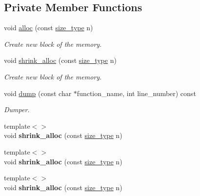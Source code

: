 \subsection*{Private Member Functions}
\begin{DoxyCompactItemize}
\item 
void \hyperlink{classatom_1_1vector__t_aa4355cec63c373a8af58c0c432a590c0}{alloc} (const \hyperlink{classatom_1_1vector__t_a1790d79321f4fa8d2580474dd0f56033}{size\+\_\+type} n)
\begin{DoxyCompactList}\small\item\em Create new block of the memory. \end{DoxyCompactList}\item 
void \hyperlink{classatom_1_1vector__t_afdf1ffed030302fa380605478984b854}{shrink\+\_\+alloc} (const \hyperlink{classatom_1_1vector__t_a1790d79321f4fa8d2580474dd0f56033}{size\+\_\+type} n)
\begin{DoxyCompactList}\small\item\em Create new block of the memory. \end{DoxyCompactList}\item 
void \hyperlink{classatom_1_1vector__t_a5dbc4a2fbead76e7bfb2105693bb9680}{dump} (const char $\ast$function\+\_\+name, int line\+\_\+number) const
\begin{DoxyCompactList}\small\item\em Dumper. \end{DoxyCompactList}\item 
\mbox{\label{classatom_1_1vector__t_a66aec7f86f32ef3d16e1d90cc7260abf}} 
{\footnotesize template$<$$>$ }\\void {\bfseries shrink\+\_\+alloc} (const \hyperlink{classatom_1_1vector__t_a1790d79321f4fa8d2580474dd0f56033}{size\+\_\+type} n)
\item 
\mbox{\label{classatom_1_1vector__t_a706b6a8755595be8690a761b0f6d4a16}} 
{\footnotesize template$<$$>$ }\\void {\bfseries shrink\+\_\+alloc} (const \hyperlink{classatom_1_1vector__t_a1790d79321f4fa8d2580474dd0f56033}{size\+\_\+type} n)
\item 
\mbox{\label{classatom_1_1vector__t_a1b0195d3556e1be900dd41476ea5063a}} 
{\footnotesize template$<$$>$ }\\void {\bfseries shrink\+\_\+alloc} (const \hyperlink{classatom_1_1vector__t_a1790d79321f4fa8d2580474dd0f56033}{size\+\_\+type} n)

\end{DoxyCompactItemize}
